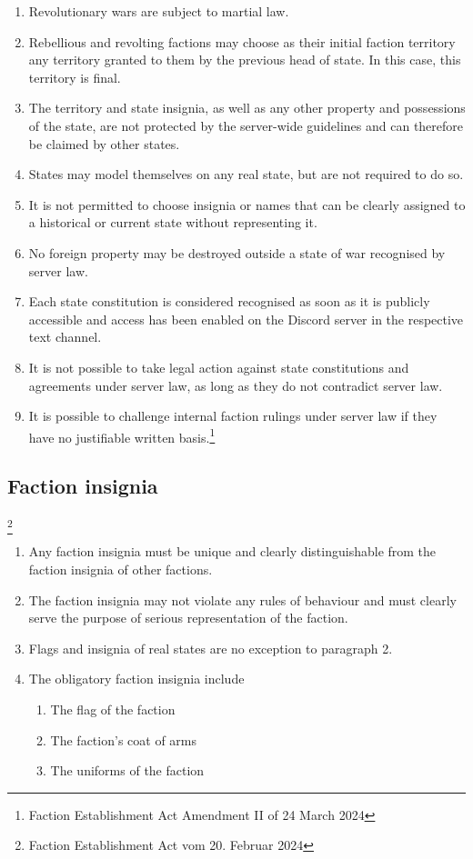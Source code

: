 \documentclass{article}
\begin{document}
\begin{enumerate}[(1)]
	\item Revolutionary wars are subject to martial law.
	\item Rebellious and revolting factions may choose as their initial faction territory any territory granted to them by the previous head of state. In this case, this territory is final.
    \item The territory and state insignia, as well as any other property and possessions of the state, are not protected by the server-wide guidelines and can therefore be claimed by other states.
    \item States may model themselves on any real state, but are not required to do so.
    \item It is not permitted to choose insignia or names that can be clearly assigned to a historical or current state without representing it.	
    \item No foreign property may be destroyed outside a state of war recognised by server law.
    \item Each state constitution is considered recognised as soon as it is publicly accessible and access has been enabled on the Discord server in the respective text channel.
    \item It is not possible to take legal action against state constitutions and agreements under server law, as long as they do not contradict server law.
    \item It is possible to challenge internal faction rulings under server law if they have no justifiable written basis.\footnote{Faction Establishment Act Amendment II of 24 March 2024}
\end{enumerate}

\subsection{Faction insignia}\footnote{Faction Establishment Act vom 20. Februar 2024}
\begin{enumerate}[(1)]
    \item Any faction insignia must be unique and clearly distinguishable from the faction insignia of other factions.
    \item The faction insignia may not violate any rules of behaviour and must clearly serve the purpose of serious representation of the faction.
    \item Flags and insignia of real states are no exception to paragraph 2.
    \item The obligatory faction insignia include
    \begin{enumerate}[1.]
        \item The flag of the faction
        \item The faction's coat of arms
        \item The uniforms of the faction
    \end{enumerate}
\end{enumerate}
\end{document}
